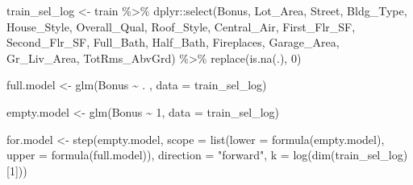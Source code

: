 \documentclass[
  letterpaper,
  DIV=11,
  numbers=noendperiod]{scrreprt}
\newenvironment{Shaded}{\begin{snugshade}}{\end{snugshade}}
\newcommand{\AttributeTok}[1]{\textcolor[rgb]{0.40,0.45,0.13}{#1}}
\newcommand{\DecValTok}[1]{\textcolor[rgb]{0.68,0.00,0.00}{#1}}
\newcommand{\FunctionTok}[1]{\textcolor[rgb]{0.28,0.35,0.67}{#1}}
\newcommand{\NormalTok}[1]{\textcolor[rgb]{0.00,0.23,0.31}{#1}}
\newcommand{\OtherTok}[1]{\textcolor[rgb]{0.00,0.23,0.31}{#1}}
\newcommand{\SpecialCharTok}[1]{\textcolor[rgb]{0.37,0.37,0.37}{#1}}
\newcommand{\StringTok}[1]{\textcolor[rgb]{0.13,0.47,0.30}{#1}}
\begin{document}
\begin{Shaded}
\begin{Highlighting}[]
\NormalTok{train\_sel\_log }\OtherTok{\textless{}{-}}\NormalTok{ train }\SpecialCharTok{\%\textgreater{}\%} 
\NormalTok{  dplyr}\SpecialCharTok{::}\FunctionTok{select}\NormalTok{(Bonus, }
\NormalTok{         Lot\_Area,}
\NormalTok{         Street,}
\NormalTok{         Bldg\_Type,}
\NormalTok{         House\_Style,}
\NormalTok{         Overall\_Qual,}
\NormalTok{         Roof\_Style,}
\NormalTok{         Central\_Air,}
\NormalTok{         First\_Flr\_SF,}
\NormalTok{         Second\_Flr\_SF,}
\NormalTok{         Full\_Bath,}
\NormalTok{         Half\_Bath,}
\NormalTok{         Fireplaces,}
\NormalTok{         Garage\_Area,}
\NormalTok{         Gr\_Liv\_Area, }
\NormalTok{         TotRms\_AbvGrd) }\SpecialCharTok{\%\textgreater{}\%}
  \FunctionTok{replace}\NormalTok{(}\FunctionTok{is.na}\NormalTok{(.), }\DecValTok{0}\NormalTok{)}

\NormalTok{full.model }\OtherTok{\textless{}{-}} \FunctionTok{glm}\NormalTok{(Bonus }\SpecialCharTok{\textasciitilde{}}\NormalTok{ . , }\AttributeTok{data =}\NormalTok{ train\_sel\_log)}

\NormalTok{empty.model }\OtherTok{\textless{}{-}} \FunctionTok{glm}\NormalTok{(Bonus }\SpecialCharTok{\textasciitilde{}} \DecValTok{1}\NormalTok{, }\AttributeTok{data =}\NormalTok{ train\_sel\_log)}
\end{Highlighting}
\end{Shaded}

\begin{Shaded}
\begin{Highlighting}[]
\NormalTok{for.model }\OtherTok{\textless{}{-}} \FunctionTok{step}\NormalTok{(empty.model,}
                  \AttributeTok{scope =} \FunctionTok{list}\NormalTok{(}\AttributeTok{lower =} \FunctionTok{formula}\NormalTok{(empty.model),}
                               \AttributeTok{upper =} \FunctionTok{formula}\NormalTok{(full.model)),}
                  \AttributeTok{direction =} \StringTok{"forward"}\NormalTok{, }\AttributeTok{k =} \FunctionTok{log}\NormalTok{(}\FunctionTok{dim}\NormalTok{(train\_sel\_log)[}\DecValTok{1}\NormalTok{]))}
\end{Highlighting}
\end{Shaded}
\end{document}

